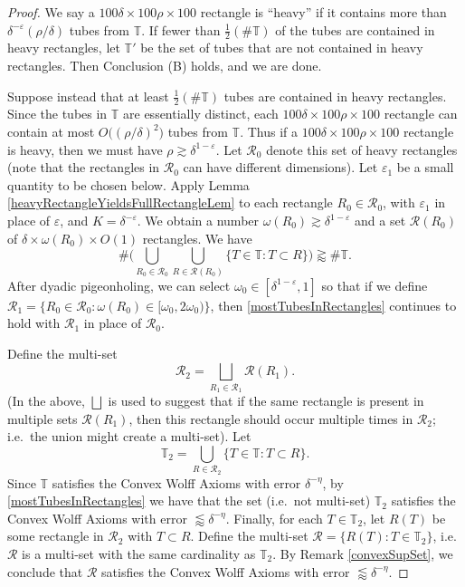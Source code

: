 \documentclass[letterpaper, reqno,11pt]{article}
\numberwithin{equation}{section}
\newcommand{\eps}{\varepsilon}
\newcommand{\tubes}{\mathbb{T}}
\numberwithin{thm}{section}
\theoremstyle{remark}
\begin{document}
\begin{proof}
We say a $100\delta\times100 \rho\times 100$ rectangle is ``heavy'' if it contains more than $\delta^{-\eps}(\rho/\delta)$ tubes from $\tubes$. If fewer than $\frac{1}{2}(\#\tubes)$ of the tubes are contained in heavy rectangles, let $\tubes'$ be the set of tubes that are not contained in heavy rectangles. Then Conclusion (B) holds, and we are done.

Suppose instead that at least $\frac{1}{2}(\#\tubes)$ tubes are contained in heavy rectangles. Since the tubes in $\tubes$ are essentially distinct, each $100\delta\times100 \rho\times 100$ rectangle can contain at most $O\big((\rho/\delta)^2\big)$ tubes from $\tubes$. Thus if a $100\delta\times100 \rho\times 100$ rectangle is heavy, then we must have $\rho\gtrsim\delta^{1-\eps}$. Let $\mathcal{R}_0$ denote this set of heavy rectangles (note that the rectangles in $\mathcal{R}_0$ can have different dimensions). Let $\eps_1$ be a small quantity to be chosen below. Apply Lemma \ref{heavyRectangleYieldsFullRectangleLem} to each rectangle $R_0\in\mathcal{R}_0$, with $\eps_1$ in place of $\eps$, and $K=\delta^{-\eps}$. We obtain a number $\omega(R_0)\gtrsim \delta^{1-\eps}$ and a set $\mathcal{R}(R_0)$ of $\delta\times\omega(R_0)\times O(1)$ rectangles. We have
\begin{equation}\label{mostTubesInRectangles}
\#\Big(\bigcup_{R_0\in\mathcal{R}_0}\bigcup_{R\in\mathcal{R}(R_0)}\{T\in\tubes\colon T\subset R\}\Big)\gtrapprox\#\tubes.
\end{equation}
After dyadic pigeonholing, we can select $\omega_0\in[\delta^{1-\eps},1]$ so that if we define $\mathcal{R}_1=\{R_0\in\mathcal{R}_0\colon \omega(R_0)\in[\omega_0, 2\omega_0)\}$, then \eqref{mostTubesInRectangles} continues to hold with $\mathcal{R}_1$ in place of $\mathcal{R}_0$. 

Define the multi-set
\[
\mathcal{R}_2=\bigsqcup_{R_1\in\mathcal{R}_1}\mathcal{R}(R_1).
\]
(In the above, $\bigsqcup$ is used to suggest that if the same rectangle is present in multiple sets $\mathcal{R}(R_1)$, then this rectangle should occur multiple times in $\mathcal{R}_2$; i.e.~the union might create a multi-set). Let
\[
\tubes_2=\bigcup_{R\in\mathcal{R}_2}\{T\in\tubes\colon T\subset R\}.
\]
Since $\tubes$ satisfies the Convex Wolff Axioms with error $\delta^{-\eta}$, by \eqref{mostTubesInRectangles} we have that the set (i.e.~not multi-set) $\tubes_2$ satisfies the Convex Wolff Axioms with error $\lessapprox \delta^{-\eta}$. Finally, for each $T\in\tubes_2$, let $R(T)$ be some rectangle in $\mathcal{R}_2$ with $T\subset R$. Define the multi-set $\mathcal{R}=\{R(T)\colon T\in\tubes_2\}$, i.e.~$\mathcal{R}$ is a multi-set with the same cardinality as $\tubes_2$. By Remark \ref{convexSupSet}, we conclude that $\mathcal{R}$ satisfies the Convex Wolff Axioms with error $\lessapprox\delta^{-\eta}$.  


\end{proof}
\end{document}
